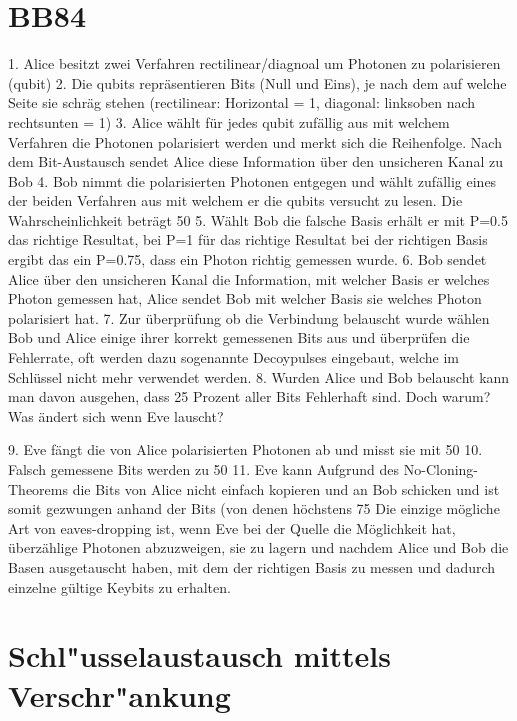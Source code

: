\begin{refsection}
\section{BB84}
1. Alice besitzt zwei Verfahren rectilinear/diagnoal um Photonen zu polarisieren (qubit)
2. Die qubits repräsentieren Bits (Null und Eins), je nach dem auf welche Seite sie schräg stehen (rectilinear: Horizontal = 1, diagonal: linksoben nach rechtsunten = 1)
3. Alice wählt für jedes qubit zufällig aus mit welchem Verfahren die Photonen polarisiert werden und merkt sich die Reihenfolge. Nach dem Bit-Austausch sendet Alice diese Information über den unsicheren Kanal zu Bob
4. Bob nimmt die polarisierten Photonen entgegen und wählt zufällig eines der beiden Verfahren aus mit welchem er die qubits versucht zu lesen. Die Wahrscheinlichkeit beträgt 50%
5. Wählt Bob die falsche Basis erhält er mit P=0.5 das richtige Resultat, bei P=1 für das richtige Resultat bei der richtigen Basis ergibt das ein P=0.75, dass ein Photon richtig gemessen wurde.
6. Bob sendet Alice über den unsicheren Kanal die Information, mit welcher Basis er welches Photon gemessen hat, Alice sendet Bob mit welcher Basis sie welches Photon polarisiert hat.
7. Zur überprüfung ob die Verbindung belauscht wurde wählen Bob und Alice einige ihrer korrekt gemessenen Bits aus und überprüfen die Fehlerrate, oft werden dazu sogenannte Decoypulses eingebaut, welche im Schlüssel nicht mehr verwendet werden.
8. Wurden Alice und Bob belauscht kann man davon ausgehen, dass 25 Prozent aller Bits Fehlerhaft sind. Doch warum? Was ändert sich wenn Eve lauscht?

9. Eve fängt die von Alice polarisierten Photonen ab und misst sie mit 50%
10. Falsch gemessene Bits werden zu 50%
11. Eve kann Aufgrund des No-Cloning-Theorems die Bits von Alice nicht einfach kopieren und an Bob schicken und ist somit gezwungen anhand der Bits (von denen höchstens 75%
Die einzige mögliche Art von eaves-dropping ist, wenn Eve bei der Quelle die Möglichkeit hat, überzählige Photonen abzuzweigen, sie zu lagern und nachdem Alice und Bob die Basen ausgetauscht haben, mit dem der richtigen Basis zu messen und dadurch einzelne gültige Keybits zu erhalten.
\section{Schl"usselaustausch mittels Verschr"ankung}

\printbibliography[heading=subbibliography]
\end{refsection}

